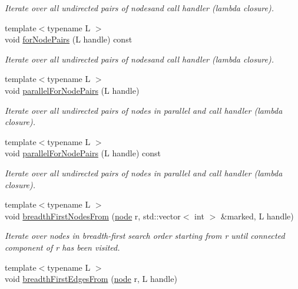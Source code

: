 \begin{DoxyCompactItemize}
\begin{DoxyCompactList}\small\item\em Iterate over all undirected pairs of nodesand call handler (lambda closure). \end{DoxyCompactList}\item 
{\footnotesize template$<$typename L $>$ }\\void \hyperlink{class_networ_kit_1_1_graph_a4d313c86d4fdb03af369ed33c2d66e02}{for\-Node\-Pairs} (L handle) const 
\begin{DoxyCompactList}\small\item\em Iterate over all undirected pairs of nodesand call handler (lambda closure). \end{DoxyCompactList}\item 
{\footnotesize template$<$typename L $>$ }\\void \hyperlink{class_networ_kit_1_1_graph_a7b7ce5c377baf11553e700dbe76cfba5}{parallel\-For\-Node\-Pairs} (L handle)
\begin{DoxyCompactList}\small\item\em Iterate over all undirected pairs of nodes in parallel and call handler (lambda closure). \end{DoxyCompactList}\item 
{\footnotesize template$<$typename L $>$ }\\void \hyperlink{class_networ_kit_1_1_graph_afc68ceae56467a28d722a117f00bf50f}{parallel\-For\-Node\-Pairs} (L handle) const 
\begin{DoxyCompactList}\small\item\em Iterate over all undirected pairs of nodes in parallel and call handler (lambda closure). \end{DoxyCompactList}\item 
{\footnotesize template$<$typename L $>$ }\\void \hyperlink{class_networ_kit_1_1_graph_a02659fe2c37176f0fdb3c2a5099c75cf}{breadth\-First\-Nodes\-From} (\hyperlink{namespace_networ_kit_a53fe3e4fd04ea024160e4d024dfebadf}{node} r, std\-::vector$<$ int $>$ \&marked, L handle)
\begin{DoxyCompactList}\small\item\em Iterate over nodes in breadth-\/first search order starting from r until connected component of r has been visited. \end{DoxyCompactList}\item 
{\footnotesize template$<$typename L $>$ }\\void \hyperlink{class_networ_kit_1_1_graph_a571265128780839333214b2d14d15e1b}{breadth\-First\-Edges\-From} (\hyperlink{namespace_networ_kit_a53fe3e4fd04ea024160e4d024dfebadf}{node} r, L handle)

\end{DoxyCompactItemize}
